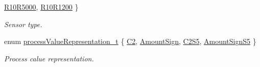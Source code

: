 \begin{DoxyCompactItemize}
\hyperlink{classmdt_device_modbus_wago_module_rtd_a3ef847ef5be945559be1271e15905fb0a0690048c3a5da4a12499c19f41796411}{R10R5000}, 
\hyperlink{classmdt_device_modbus_wago_module_rtd_a3ef847ef5be945559be1271e15905fb0a49dced9911f2b03c950071afcdb1e30f}{R10R1200}
 \}
\begin{DoxyCompactList}\small\item\em Sensor type. \end{DoxyCompactList}\item 
enum \hyperlink{classmdt_device_modbus_wago_module_rtd_a6edcc72b85641ca88d66ca45a7650ca8}{processValueRepresentation\_\-t} \{ \hyperlink{classmdt_device_modbus_wago_module_rtd_a6edcc72b85641ca88d66ca45a7650ca8a46b618df5f4f98c2284b015c76e2d5b6}{C2}, 
\hyperlink{classmdt_device_modbus_wago_module_rtd_a6edcc72b85641ca88d66ca45a7650ca8a2dbc0577b6cee124301b6f3d35240a42}{AmountSign}, 
\hyperlink{classmdt_device_modbus_wago_module_rtd_a6edcc72b85641ca88d66ca45a7650ca8ae19394d1163ada7da4f546e64468df76}{C2S5}, 
\hyperlink{classmdt_device_modbus_wago_module_rtd_a6edcc72b85641ca88d66ca45a7650ca8abb5c362af8e7317be54a4346e0915d13}{AmountSignS5}
 \}
\begin{DoxyCompactList}\small\item\em Process calue representation. \end{DoxyCompactList}\end{DoxyCompactItemize}

